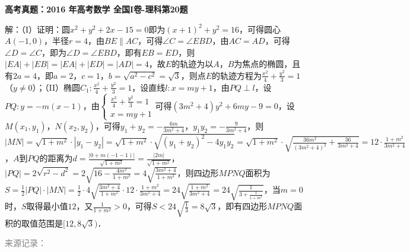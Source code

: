 \documentclass[UTF8,a4paper,11pt]{ctexart}
\newenvironment{gaokao}[1]{\par\medskip\noindent\textbf{高考真题：#1}\par\smallskip}{\par\medskip}
\begin{document}
\begin{gaokao}{2016 年高考数学 全国I卷-理科第20题}
解：（I）证明：圆$x^2+y^2+2x-15=0$即为$(x+1)^2+y^2=16$，可得圆心$A(-1,0)$，半径$r=4$，由$BE\parallel AC$，可得$\angle C=\angle EBD$，由$AC=AD$，可得$\angle D=\angle C$，即为$\angle D=\angle EBD$，即有$EB=ED$，则$|EA|+|EB|=|EA|+|ED|=|AD|=4$，故$E$的轨迹为以$A$，$B$为焦点的椭圆，且有$2a=4$，即$a=2$，$c=1$，$b=\sqrt{a^2-c^2}=\sqrt{3}$，则点$E$的轨迹方程为$\frac{x^2}{4}+\frac{y^2}{3}=1$（$y\neq0$）；（II）椭圆$C_1:\frac{x^2}{4}+\frac{y^2}{3}=1$，设直线$l:x=my+1$，由$PQ\perp l$，设$PQ:y=-m(x-1)$，由$\begin{cases}\frac{x^2}{4}+\frac{y^2}{3}=1\\x=my+1\end{cases}$可得$(3m^2+4)y^2+6my-9=0$，设$M(x_1,y_1)$，$N(x_2,y_2)$，可得$y_1+y_2=-\frac{6m}{3m^2+4}$，$y_1y_2=-\frac{9}{3m^2+4}$，则$|MN|=\sqrt{1+m^2}\cdot|y_1-y_2|=\sqrt{1+m^2}\cdot\sqrt{(y_1+y_2)^2-4y_1y_2}=\sqrt{1+m^2}\cdot\sqrt{\frac{36m^2}{(3m^2+4)^2}+\frac{36}{3m^2+4}}=12\cdot\frac{1+m^2}{3m^2+4}$，$A$到$PQ$的距离为$d=\frac{|0+m(-1-1)|}{\sqrt{1+m^2}}=\frac{|2m|}{\sqrt{1+m^2}}$，$|PQ|=2\sqrt{r^2-d^2}=2\sqrt{16-\frac{4m^2}{1+m^2}}=4\sqrt{\frac{3m^2+4}{1+m^2}}$，则四边形$MPNQ$面积为$S=\frac{1}{2}|PQ|\cdot|MN|=\frac{1}{2}\cdot4\sqrt{\frac{3m^2+4}{1+m^2}}\cdot12\cdot\frac{1+m^2}{3m^2+4}=24\sqrt{\frac{1+m^2}{3m^2+4}}=24\sqrt{\frac{1}{3+\frac{1}{1+m^2}}}$，当$m=0$时，$S$取得最小值$12$，又$\frac{1}{1+m^2}>0$，可得$S<24\sqrt{\frac{1}{3}}=8\sqrt{3}$，即有四边形$MPNQ$面积的取值范围是$[12,8\sqrt{3})$．

\par\smallskip\textcolor{gray}{\footnotesize 来源记录：\texttt{}}

\end{gaokao}
\end{document}
